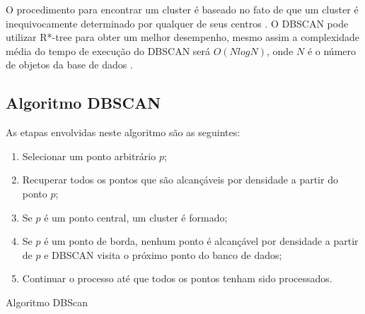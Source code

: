 \begin{figure}[!h]
	\centering
\end{figure}

O procedimento para encontrar um cluster é baseado no fato de que um cluster é
inequivocamente determinado por qualquer de seus centros \cite{ESTER1998}. 
O DBSCAN pode utilizar R*-tree para obter um melhor desempenho, mesmo assim  a complexidade média do tempo de execução do DBSCAN será ${O (N logN)}$, onde ${N}$ é o número de objetos da base de dados \cite{Sheikholeslami1998}.

\subsection{Algoritmo DBSCAN}

As etapas envolvidas neste algoritmo são as seguintes:

\begin{enumerate}
	\item Selecionar um ponto arbitrário ${p}$;
	\item Recuperar todos os pontos que são alcançáveis por densidade a partir do ponto ${p}$;
	\item Se ${p}$ é um ponto central, um cluster é formado;
	\item Se ${p}$ é um ponto de borda, nenhum ponto é alcançável por densidade a partir de ${p}$ e DBSCAN visita o próximo ponto do banco de dados;
	\item Continuar o processo até que todos os pontos tenham sido processados.
\end{enumerate}


\begin{algorithm}[h!]
	\SetSpacedAlgorithm
	\caption{\label{alg:algoritmo_dbscan}Algoritmo DBScan}
\end{algorithm}

